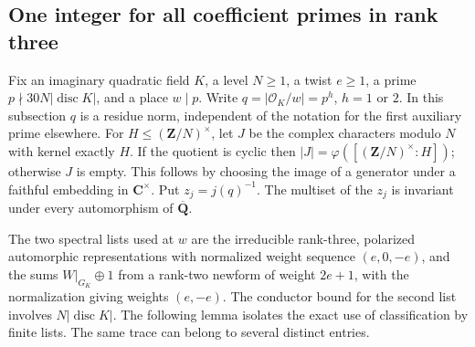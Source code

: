 \subsection{One integer for all coefficient primes in rank three}\label{rk3:sec}

Fix an imaginary quadratic field \(K\), a level \(N\ge1\), a twist
\(e\ge1\), a prime \(p\nmid30N|\operatorname{disc}K|\), and a place
\(w\mid p\). Write \(q=|\mathcal O_K/w|=p^h\), \(h=1\) or \(2\).
In this subsection \(q\) is a residue norm, independent of the notation
for the first auxiliary prime elsewhere. For \(H\le(\mathbf Z/N)^\times\),
let \(J\) be the complex characters modulo \(N\) with kernel exactly \(H\).
If the quotient is cyclic then \(|J|=\varphi([(\mathbf Z/N)^\times:H])\);
otherwise \(J\) is empty. This follows by choosing the image of a generator
under a faithful embedding in \(\mathbf C^\times\). Put \(z_j=j(q)^{-1}\).
The multiset of the \(z_j\) is invariant under every automorphism of
\(\overline{\mathbf Q}\).

The two spectral lists used at \(w\) are the irreducible rank-three,
polarized automorphic representations with normalized weight sequence
\((e,0,-e)\), and the sums \(W|_{G_K}\oplus1\) from a rank-two newform
of weight \(2e+1\), with the normalization giving weights \((e,-e)\).
The conductor bound for the second list involves \(N|\operatorname{disc}K|\).
The following lemma isolates the exact use of classification by finite
lists. The same trace can belong to several distinct entries.

